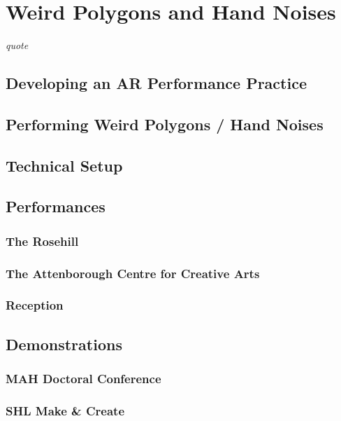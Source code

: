 \chapter{Weird Polygons and Hand Noises}
\label{sec: performance}
\epigraph{\emph{quote}}{\citep[]{bilbow2022}}



\section{Developing an AR Performance Practice} \label{sec: performance-developing}




\section{Performing Weird Polygons / Hand Noises} \label{sec: performance-experience}



\section{Technical Setup} \label{sec: performance-setup}




\section{Performances} \label{sec: performance-performances}
\subsection{The Rosehill} \label{sec: performance-performances-rosehill}
\subsection{The Attenborough Centre for Creative Arts} \label{sec: performance-performances-acca}
\subsection{Reception} \label{sec: performance-performances-reception}



\section{Demonstrations} \label{sec: performance-demonstrations}
\subsection{MAH Doctoral Conference} \label{sec: performance-demonstrations-mah}
\subsection{SHL Make \& Create} \label{sec: performance-demonstrations-shl}
